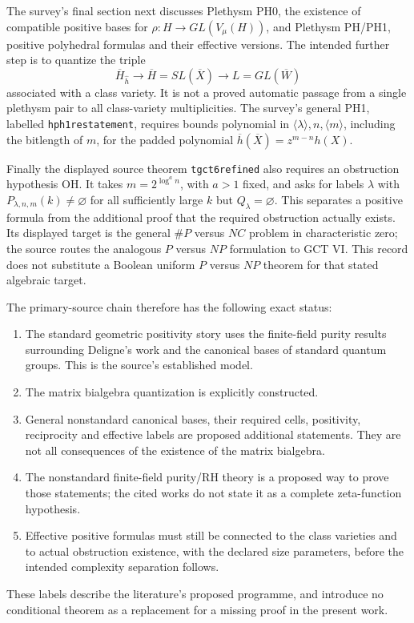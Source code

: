 The survey's final section next discusses Plethysm PH0, the existence
of compatible positive bases for $\rho:H\to GL(V_\mu(H))$, and
Plethysm PH/PH1, positive polyhedral formulas and their effective
versions.  The intended further step is to quantize the triple
\[
 \overline H_{\widehat h}\longrightarrow
 \overline H=SL(\overline X)\longrightarrow L=GL(\overline W)
\]
associated with a class variety.  It is not a proved automatic passage
from a single plethysm pair to all class-variety multiplicities.
The survey's general PH1, labelled \texttt{hph1restatement}, requires
bounds polynomial in $\langle\lambda\rangle,n,\langle m\rangle$,
including the bitlength of $m$, for the padded polynomial
$\overline h(\overline X)=z^{m-n}h(X)$.

Finally the displayed source theorem \texttt{tgct6refined} also requires
an obstruction hypothesis OH.  It takes
$m=2^{\log^a n}$, with $a>1$ fixed, and asks for labels $\lambda$ with
$P_{\lambda,n,m}(k)\ne\varnothing$ for all sufficiently large $k$
but $Q_\lambda=\varnothing$.  This separates a positive formula from
the additional proof that the required obstruction actually exists.
Its displayed target is the general $\#P$ versus $NC$ problem in
characteristic zero; the source routes the analogous $P$ versus $NP$
formulation to GCT VI.  This record does not substitute a Boolean uniform
$P$ versus $NP$ theorem for that stated algebraic target.

The primary-source chain therefore has the following exact status:
\begin{enumerate}
\item The standard geometric positivity story uses the finite-field
purity results surrounding Deligne's work and the canonical bases of
standard quantum groups.  This is the source's established model.
\item The matrix bialgebra quantization is explicitly constructed.
\item General nonstandard canonical bases, their required cells,
positivity, reciprocity and effective labels are proposed additional
statements.  They are not all consequences of the existence of the
matrix bialgebra.
\item The nonstandard finite-field purity/RH theory is a proposed way to
prove those statements; the cited works do not state it as a complete
zeta-function hypothesis.
\item Effective positive formulas must still be connected to the class
varieties and to actual obstruction existence, with the declared size
parameters, before the intended complexity separation follows.
\end{enumerate}
These labels describe the literature's proposed programme, and introduce
no conditional theorem as a replacement for a missing proof in the
present work.

